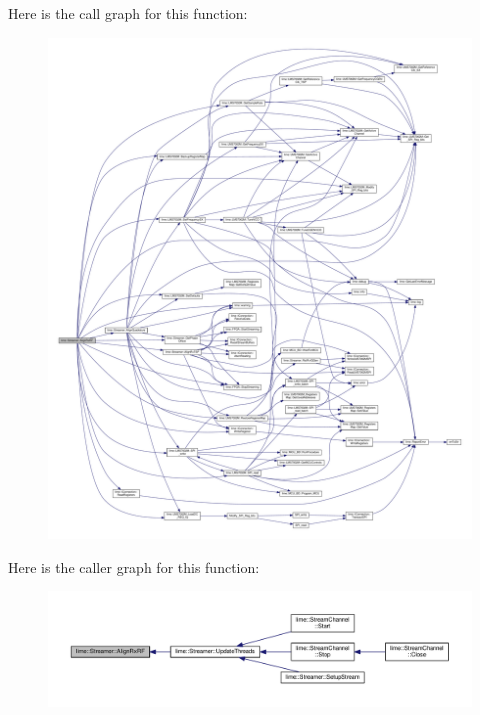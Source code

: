 Here is the call graph for this function\+:
\nopagebreak
\begin{figure}[H]
\begin{center}
\leavevmode
\includegraphics[width=350pt]{d9/d5d/classlime_1_1Streamer_a05cbd39a0d43b90b7fc2543ec246e9bb_cgraph}
\end{center}
\end{figure}




Here is the caller graph for this function\+:
\nopagebreak
\begin{figure}[H]
\begin{center}
\leavevmode
\includegraphics[width=350pt]{d9/d5d/classlime_1_1Streamer_a05cbd39a0d43b90b7fc2543ec246e9bb_icgraph}
\end{center}
\end{figure}



